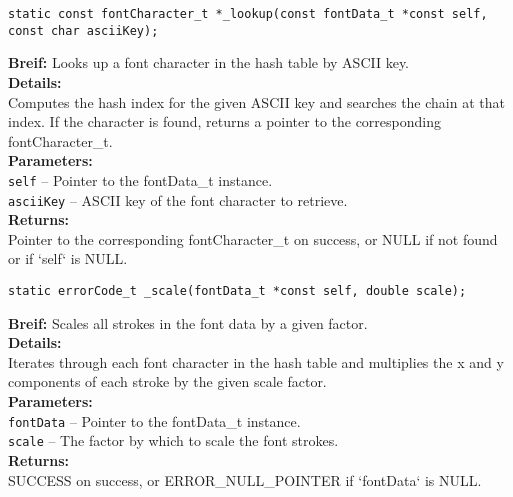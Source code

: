 \begin{verbatim}
static const fontCharacter_t *_lookup(const fontData_t *const self, const char asciiKey);
\end{verbatim}
\textbf{Breif:} Looks up a font character in the hash table by ASCII key. \\
\textbf{Details:} \\
\hspace*{1cm}Computes the hash index for the given ASCII key and searches the chain at that index. If the character is found, returns a pointer to the corresponding fontCharacter\_t. \\
\textbf{Parameters:} \\
\hspace*{1cm}\texttt{self} -- Pointer to the fontData\_t instance. \\
\hspace*{1cm}\texttt{asciiKey} -- ASCII key of the font character to retrieve. \\
\textbf{Returns:} \\
\hspace*{1cm}Pointer to the corresponding fontCharacter\_t on success, or NULL if not found or if `self` is NULL. \\[1em]

\begin{verbatim}
static errorCode_t _scale(fontData_t *const self, double scale);
\end{verbatim}
\textbf{Breif:} Scales all strokes in the font data by a given factor. \\
\textbf{Details:} \\
\hspace*{1cm}Iterates through each font character in the hash table and multiplies the x and y components of each stroke by the given scale factor. \\
\textbf{Parameters:} \\
\hspace*{1cm}\texttt{fontData} -- Pointer to the fontData\_t instance. \\
\hspace*{1cm}\texttt{scale} -- The factor by which to scale the font strokes. \\
\textbf{Returns:} \\
\hspace*{1cm}SUCCESS on success, or ERROR\_NULL\_POINTER if `fontData` is NULL. \\[1em]

